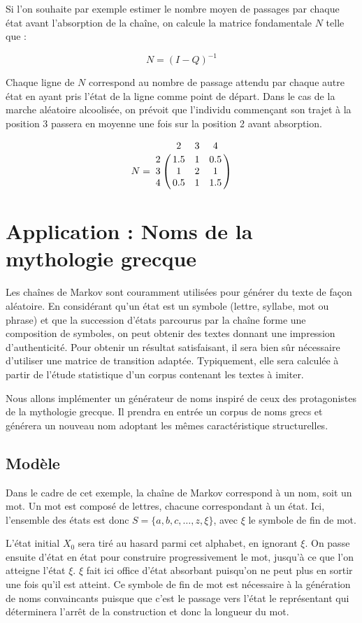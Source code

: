 \documentclass[12pt]{article}
\begin{document}
Si l'on souhaite par exemple estimer le nombre moyen de passages par
chaque état avant l'absorption de la chaîne, on calcule la matrice
fondamentale $N$ telle que :

$$
N = (I - Q)^{-1}
$$

Chaque ligne de $N$ correspond au nombre de passage attendu par chaque
autre état en ayant pris l'état de la ligne comme point de
départ. Dans le cas de la marche aléatoire alcoolisée, on prévoit que
l'individu commençant son trajet à la position 3 passera en moyenne
une fois sur la position 2 avant absorption.

$$
N =
\bordermatrix{
  & 2 & 3 & 4 \cr
  2 & 1.5 & 1 & 0.5 \cr
  3 & 1 & 2 & 1 \cr
  4 & 0.5 & 1 & 1.5
}
$$

\section{Application : Noms de la mythologie grecque}

Les chaînes de Markov sont couramment utilisées pour générer du texte
de façon aléatoire. En considérant qu'un état est un symbole (lettre,
syllabe, mot ou phrase) et que la succession d'états parcourus par la
chaîne forme une composition de symboles, on peut obtenir des textes
donnant une impression d'authenticité. Pour obtenir un résultat
satisfaisant, il sera bien sûr nécessaire d'utiliser une matrice de
transition adaptée. Typiquement, elle sera calculée à partir de
l'étude statistique d'un corpus contenant les textes à imiter.

Nous allons implémenter un générateur de noms inspiré de ceux des
protagonistes de la mythologie grecque. Il prendra en entrée un corpus
de noms grecs et générera un nouveau nom adoptant les mêmes
caractéristique structurelles.

\subsection{Modèle}

Dans le cadre de cet exemple, la chaîne de Markov correspond à un nom,
soit un mot. Un mot est composé de lettres, chacune correspondant à un
état. Ici, l'ensemble des états est donc $S = \{a, b, c, \dots, z, \xi
\}$, avec $\xi$ le symbole de fin de mot.

L'état initial $X_0$ sera tiré au hasard parmi cet alphabet, en
ignorant $\xi$. On passe ensuite d'état en état pour construire
progressivement le mot, jusqu'à ce que l'on atteigne l'état
$\xi$. $\xi$ fait ici office d'état absorbant puisqu'on ne peut plus
en sortir une fois qu'il est atteint. Ce symbole de fin de mot est
nécessaire à la génération de noms convaincants puisque que c'est le
passage vers l'état le représentant qui déterminera l'arrêt de la
construction et donc la longueur du mot.
\end{document}
